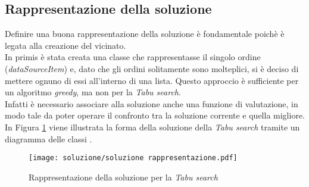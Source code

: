 \subsection{Rappresentazione della soluzione}
\label{sec:rappresentazione-della-soluzione}
\noindent Definire una buona rappresentazione della soluzione è fondamentale
poichè è legata alla creazione del vicinato.\\
In primis è stata creata una classe che rappresentasse
il singolo ordine (\textit{dataSourceItem}) e, dato che gli ordini solitamente sono molteplici,
si è deciso di mettere ognuno di essi all'interno di una lista.
Questo approccio è sufficiente per un algoritmo \textit{greedy}, ma non per la \textit{Tabu search}.\\
Infatti è necessario associare alla soluzione anche una funzione di valutazione, in modo tale
da poter operare il confronto tra la soluzione corrente e quella migliore.\\
In Figura \ref{rappresentazione-soluzione} viene illustrata la forma della soluzione della \textit{Tabu search} tramite un diagramma delle classi \cite{siteH:rcardin}.
\begin{figure}[!h] 
    \centering 
    \texttt{[image: soluzione/soluzione rappresentazione.pdf]} 
    \caption{Rappresentazione della soluzione per la \textit{Tabu search}}
    \label{rappresentazione-soluzione}
\end{figure}

